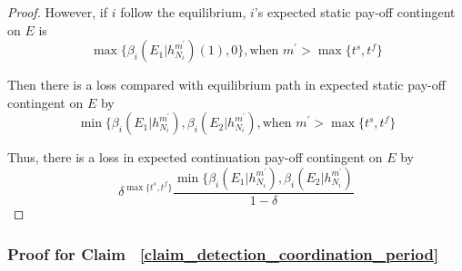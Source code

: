 \documentclass[12pt]{article}
\theoremstyle{remark}
\theoremstyle{remark}
\begin{document}
\begin{proof}
However, if $i$ follow the equilibrium, $i$'s expected static pay-off contingent on $E$ is 
\begin{equation}
\max\{\beta_{i}(E_1|h^{m^{'}}_{N_i})(1),0\}, \text{when } m^{'}> \max\{t^s,t^f\}
\end{equation}

Then there is a loss compared with equilibrium path in expected static pay-off contingent on $E$ by
\begin{equation}
\min\{\beta_{i}(E_1|h^{m^{'}}_{N_i}),\beta_{i}(E_2|h^{m^{'}}_{N_i}), \text{when } m^{'}> \max\{t^s,t^f\}
\end{equation}

Thus, there is a loss in expected continuation pay-off contingent on $E$ by
\[\delta^{\max\{t^s,t^f\}}\frac{\min\{\beta_{i}(E_1|h^{m^{'}}_{N_i}),\beta_{i}(E_2|h^{m^{'}}_{N_i})}{1-\delta}\]

\end{proof}





\subsubsection{Proof for Claim ~\ref{claim_detection_coordination_period}}
\end{document}
